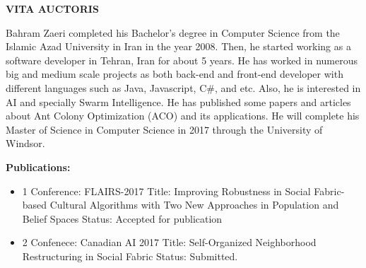 {\centering
	\fontsize{17.5}{0}
	\textbf{VITA AUCTORIS}
\par}
Bahram Zaeri completed his Bachelor's degree in Computer Science from the Islamic Azad University in Iran in the year 2008. Then, he started working as a software developer in Tehran, Iran for about 5 years. He has worked in numerous big and medium scale projects as both back-end and front-end developer with different languages such as Java, Javascript, C\#, and etc. Also, he is interested in AI and specially Swarm Intelligence. He has published some papers and articles about Ant Colony Optimization (ACO) and its applications. He will complete his Master of Science in Computer Science in 2017 through the University of Windsor. 
\newline
\par \textbf{Publications:}
\begin{itemize}{}
	\item 1 \newline
	Conference: FLAIRS-2017 \newline
	Title: Improving Robustness in Social Fabric-based Cultural Algorithms with Two New Approaches in Population and Belief Spaces\newline
	Status: Accepted for publication
	\item 2 \newline
	Confenece: Canadian AI 2017\newline
	Title: Self-Organized Neighborhood Restructuring in Social Fabric\newline
	Status: Submitted.
\end{itemize}

